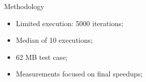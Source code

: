 \begin{frame}{Methodology}
	\begin{itemize}
		\vfill
		\item Limited execution: 5000 iterations;
		\vfill
		\item Median of 10 executions;
		\vfill
		\item 62 MB test case;
		\vfill
		\item Measurements focused on final speedups;
		\vfill
	\end{itemize}
\end{frame}